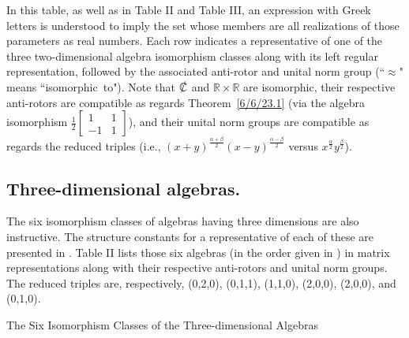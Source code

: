 \documentclass{amsart}
\theoremstyle{definition}
\numberwithin{theorem}{section}
\numberwithin{equation}{section}
\begin{document}
\bigskip


 {\small In this table, as well as in Table II and Table III, an expression with Greek letters is understood to imply the set whose members are all realizations of those parameters as real numbers.  Each row indicates a representative  of one of the three two-dimensional algebra isomorphism classes along with its left regular representation, followed by the associated anti-rotor and unital norm group (``$\approx$" means \mbox{``isomorphic to"}). Note that  $\slashed{\mathbb{C}}$ and $\mathbb{R}\times\mathbb{R}$ are isomorphic, their respective anti-rotors are compatible as regards \mbox{Theorem \ref{6/6/23.1}} (via the algebra isomorphism $\frac{1}{2}\left[\begin{array}{ccc}
 1 & 1   \\ 
 -1 & 1    
\end{array}\right]$), and their unital norm groups are  compatible as regards the reduced triples (i.e., $(x+y)^{\frac{\alpha+\beta}{2}}(x-y)^{\frac{\alpha-\beta}{2}}$ versus $x^\frac{\alpha}{2} y^\frac{\beta}{2}$).}

\vspace{.75cm} 

\subsection{Three-dimensional algebras.} The six isomorphism classes of  algebras having three dimensions are also instructive.  The structure constants for a representative of each of these are presented in \cite{kobayashi:2021}.  Table II lists those six algebras (in the order given in \cite{kobayashi:2021}) in matrix representations along with their respective anti-rotors and unital norm groups. The  reduced triples are, respectively, (0,2,0), (0,1,1), (1,1,0), (2,0,0), (2,0,0), and (0,1,0).



\hspace{0pt}
\vfill

  \centerline{\large The Six Isomorphism Classes of the Three-dimensional Algebras }

\vspace{.5cm}
\end{document}
